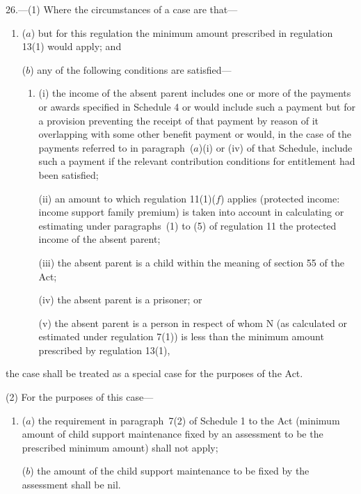 \documentclass[12pt,a4paper]{article}
\begin{document}
26.—(1) Where the circumstances of a case are that—
\begin{enumerate}\item[]
($a$) but for this regulation the minimum amount prescribed in regulation 13(1) would apply; and

($b$) any of the following conditions are satisfied—
\begin{enumerate}\item[]
(i) the income of the absent parent includes one or more of the payments or awards specified in Schedule 4 or would include such a payment but for a provision preventing the receipt of that payment by reason of it overlapping with some other benefit payment or would, in the case of the payments referred to in paragraph~($a$)(i) or (iv) of that Schedule, include such a payment if the relevant contribution conditions for entitlement had been satisfied;

(ii) an amount to which regulation 
11(1)($f$)  %
applies (protected income: income support family premium) is taken into account in calculating or estimating 
under paragraphs~(1) to (5) of regulation 11  %
the protected income of the absent parent;

(iii) the absent parent is a child within the meaning of section 55 of the Act;

(iv) the absent parent is a prisoner; or

(v) the absent parent is a person in respect of whom N (as calculated or estimated under regulation 7(1)) is less than the minimum amount prescribed by regulation 13(1),
\end{enumerate}
\end{enumerate}
the case shall be treated as a special case for the purposes of the Act.

(2) For the purposes of this case—
\begin{enumerate}\item[]
($a$) the requirement in paragraph~7(2) of Schedule 1 to the Act (minimum amount of child support maintenance fixed by an assessment to be the prescribed minimum amount) shall not apply;

($b$) the amount of the child support maintenance to be fixed by the assessment shall be nil.
\end{enumerate}

\end{document}
